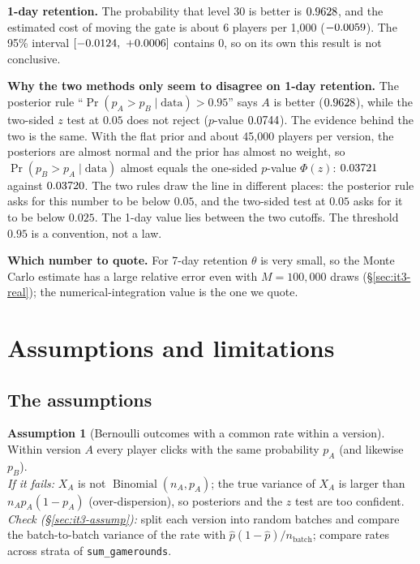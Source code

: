 \documentclass[11pt]{article}
\theoremstyle{definition}
\newtheorem{assumption}{Assumption}
\theoremstyle{remark}
\renewcommand{\Pr}{\operatorname{Pr}}
\newcommand{\Bin}{\operatorname{Binomial}}
\newcommand{\data}{\text{data}}
\begin{document}
\textbf{1-day retention.} The probability that level 30 is better is $0.9628$, and the estimated cost of
moving the gate is about 6 players per 1{,}000 ($-0.0059$). The 95\% interval $[\realOneLo,\ \realOneHi]$
contains 0, so on its own this result is not conclusive.

\textbf{Why the two methods only seem to disagree on 1-day retention.} The posterior rule ``$\Pr(p_A>p_B\mid\data)>0.95$''
says $A$ is better ($0.9628$), while the two-sided $z$ test at $0.05$ does not reject ($p$-value $0.0744$).
The evidence behind the two is the same. With the flat prior and about 45{,}000 players per version, the posteriors
are almost normal and the prior has almost no weight, so $\Pr(p_B>p_A\mid\data)$ almost equals the one-sided
$p$-value $\Phi(z)$: $0.03721$ against $0.03720$. The two rules draw the line in different places: the
posterior rule asks for this number to be below $0.05$, and the two-sided test at $0.05$ asks for it to be below
$0.025$. The 1-day value lies between the two cutoffs. The threshold $0.95$ is a convention, not a law.

\textbf{Which number to quote.} For 7-day retention $\theta$ is very small, so the Monte Carlo estimate has a large
relative error even with $M=100{,}000$ draws (\S\ref{sec:it3-real}); the numerical-integration value is the one we
quote.

\section{Assumptions and limitations}\label{sec:limits}

\subsection{The assumptions}\label{sec:assumptions}

\begin{assumption}[Bernoulli outcomes with a common rate within a version]\label{as:bern}
Within version $A$ every player clicks with the same probability $p_A$ (and likewise $p_B$).\\
\emph{If it fails:} $X_A$ is not $\Bin(n_A,p_A)$; the true variance of $X_A$ is larger than $n_Ap_A(1-p_A)$
(over-dispersion), so posteriors and the $z$ test are too confident.\\
\emph{Check (\S\ref{sec:it3-assump}):} split each version into random batches and compare the batch-to-batch
variance of the rate with $\hat p(1-\hat p)/n_{\text{batch}}$; compare rates across strata of
\texttt{sum\_gamerounds}.
\end{assumption}
\end{document}
